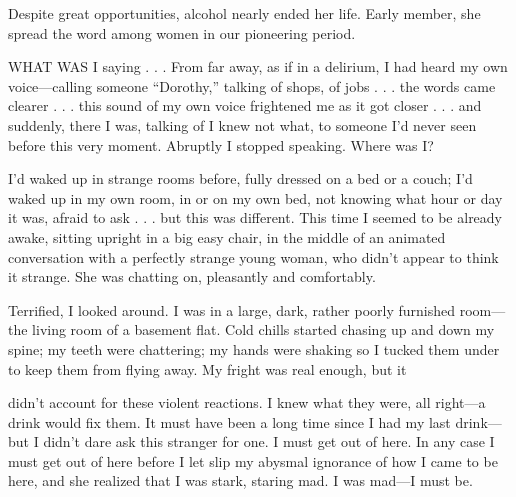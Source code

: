 
\bbChapterPreamble


\begin{biblechapter}
    Despite great opportunities, 
    alcohol nearly ended her life.
\verse Early member, 
    she spread the word among women 
    in our pioneering period.

\end{biblechapter}


\begin{biblechapter}
    WHAT WAS I saying . . . 
    From far away, as if in a delirium, 
    I had heard my own voice—calling someone “Dorothy,” 
    talking of shops, of jobs . . . 
    the words came clearer . . . 
    this sound of my own voice frightened me as it got closer . . . 
    and suddenly, there I was, 
    talking of I knew not what, 
    to someone I’d never seen before this very moment. 
\verse Abruptly I stopped speaking.
\verse Where was I?

\verse I’d waked up in strange rooms before, fully dressed on a bed or a couch; I’d waked up in my own room, in or on my own bed, not knowing what hour or day it was, afraid to ask . . . but this was different. This time I seemed to be already awake, sitting upright in a big easy chair, in the middle of an animated conversation with a perfectly strange young woman, who didn’t appear to think it strange. She was chatting on, pleasantly and comfortably.

Terrified, I looked around. I was in a large, dark, rather poorly furnished room—the living room of a basement flat. Cold chills started chasing up and down my spine; my teeth were chattering; my hands were shaking so I tucked them under to keep them from flying away. My fright was real enough, but it

didn’t account for these violent reactions. I knew what they were, all right—a drink would fix them. It must have been a long time since I had my last drink—but I didn’t dare ask this stranger for one. I must get out of here. In any case I must get out of here before I let slip my abysmal ignorance of how I came to be here, and she realized that I was stark, staring mad. I was mad—I must be.


\end{biblechapter}
